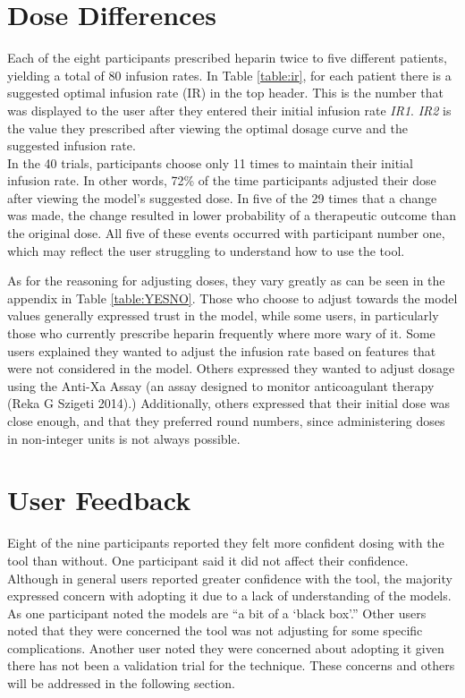 \documentclass[12pt,a4paper,]{report}
\begin{document}
\section{Dose Differences}\label{dose-differences}

Each of the eight participants prescribed heparin twice to five
different patients, yielding a total of 80 infusion rates. In Table
\ref{table:ir}, for each patient there is a suggested optimal infusion
rate (IR) in the top header. This is the number that was displayed to
the user after they entered their initial infusion rate \emph{IR1}.
\emph{IR2} is the value they prescribed after viewing the optimal dosage
curve and the suggested infusion rate.\\
In the 40 trials, participants choose only 11 times to maintain their
initial infusion rate. In other words, 72\% of the time participants
adjusted their dose after viewing the model's suggested dose. In five of
the 29 times that a change was made, the change resulted in lower
probability of a therapeutic outcome than the original dose. All five of
these events occurred with participant number one, which may reflect the
user struggling to understand how to use the tool.

As for the reasoning for adjusting doses, they vary greatly as can be
seen in the appendix in Table \ref{table:YESNO}. Those who choose to
adjust towards the model values generally expressed trust in the model,
while some users, in particularly those who currently prescribe heparin
frequently where more wary of it. Some users explained they wanted to
adjust the infusion rate based on features that were not considered in
the model. Others expressed they wanted to adjust dosage using the
Anti-Xa Assay (an assay designed to monitor anticoagulant therapy (Reka
G Szigeti 2014).) Additionally, others expressed that their initial dose
was close enough, and that they preferred round numbers, since
administering doses in non-integer units is not always possible.

\section{User Feedback}\label{user-feedback}

Eight of the nine participants reported they felt more confident dosing
with the tool than without. One participant said it did not affect their
confidence. Although in general users reported greater confidence with
the tool, the majority expressed concern with adopting it due to a lack
of understanding of the models. As one participant noted the models are
``a bit of a `black box'.'' Other users noted that they were concerned
the tool was not adjusting for some specific complications. Another user
noted they were concerned about adopting it given there has not been a
validation trial for the technique. These concerns and others will be
addressed in the following section.
\end{document}

